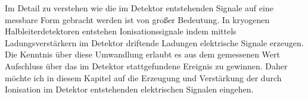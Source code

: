 Im Detail zu verstehen wie die im Detektor entstehenden Signale auf eine messbare Form gebracht werden ist von großer Bedeutung.
In kryogenen Halbleiterdetektoren entstehen Ionisationssignale indem mittels Ladungsverstärkern im Detektor driftende Ladungen elektrische Signale erzeugen.
Die Kenntnis über diese Umwandlung erlaubt es aus dem gemessenen Wert Aufschluss über das im Detektor stattgefundene Ereignis zu gewinnen.
Daher möchte ich in diesem Kapitel auf die Erzeugung und Verstärkung der durch Ionisation im Detektor entstehenden elektrischen Signalen eingehen.